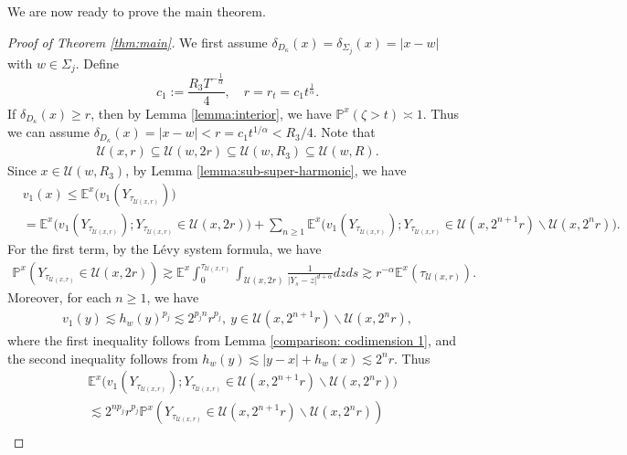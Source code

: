 \documentclass[12pt,a4paper]{amsart}
\numberwithin{equation}{section}
\theoremstyle{plain}
\newcommand{\Si}{\Sigma}
\newcommand{\mc}{\mathcal}
\newcommand{\mb}{\mathbb}
\newcommand{\1}{\mathbbm{1}}
\begin{document}
We are now ready  to prove the main theorem.

\begin{proof}[Proof of Theorem \ref{thm:main}] 
We first assume $\delta_{D_\kappa}(x) = \delta_{\Si_j}(x) = |x-w|$ with $w \in \Si_j$. Define
\begin{equation} \label{radius of t}
c_1 := \frac{R_3 T^{-\frac{1}{\alpha}}}{4},
\quad r = r_t = c_1 t^{\frac{1}{\alpha}}.
\end{equation}
If $\delta_{D_{\kappa}}(x) \ge r$, then by Lemma \ref{lemma:interior}, we have 
$\mb P^x(\zeta >t) \asymp 1$. 
Thus we can assume $\delta_{D_{\kappa}}(x) = |x-w| < r = c_1t^{1/\alpha} < 
R_3/4$. Note that 
\begin{align}\label{hierarchy of inclusion}
 \mc U(x,r)\subseteq \mc U(w,2r) \subseteq \mc U(w, R_3) \subseteq \mc U(w,R).
\end{align}
Since $x \in \mc U(w, R_3)$, by Lemma \ref{lemma:sub-super-harmonic}, we have
\begin{align*}
&  v_1(x) \le \mb E^x\big(v_1(Y_{\tau_{\mc U(x,r)}})\big) \\
& = \mb E^x\big(v_1(Y_{\tau_{\mc U(x,r)}}); Y_{\tau_{\mc U(x,r)}} \in \mc U(x,2r)\big) + \sum_{n\ge 1} \mb E^x\big(v_1(Y_{\tau_{\mc U(x,r)}}); Y_{\tau_{\mc U(x,r)}} \in \mc U(x,2^{n+1}r)\backslash \mc U(x,2^{n}r)\big).
\end{align*}
For the first term, by the L\'evy system formula, we have 
\begin{equation}\label{lower prob estimate}
\begin{aligned}
\mb P^x(Y_{\tau_{\mc U(x,r)}} \in \mc U(x,2r)) \gtrsim \mb E^x \int_0^{\tau_{\mc U(x,r)}} \int_{\mc U(x,2r)} \frac{1}{|Y_s - z|^{d+\alpha}}dzds \gtrsim r^{-\alpha} \mb E^x(\tau_{\mc U(x,r)}).
\end{aligned}
\end{equation}
Moreover, for each $n\ge 1$, we have 
\begin{align*}
v_1(y) \lesssim h_w(y)^{p_j} \lesssim 2^{p_j n}r^{p_j},\ y \in \mc U(x,2^{n+1}r)\backslash \mc U(x,2^{n}r),
\end{align*}
where the first inequality follows from Lemma \ref{comparison: codimension 1}, and the second inequality follows from 
$h_w(y) \lesssim |y-x| + h_w(x) \lesssim 2^n r$. 
Thus 
\begin{align*}
& \mb E^x\big(v_1(Y_{\tau_{\mc U(x,r)}}); Y_{\tau_{\mc U(x,r)}} \in \mc U(x,2^{n+1}r)\backslash \mc U(x,2^{n}r)\big) \\
& \lesssim 2^{np_j}r^{p_j} \mb P^x(Y_{\tau_{\mc U(x,r)}} \in \mc U(x,2^{n+1}r)\backslash \mc U(x,2^{n}r)) \\

\end{align*}
\end{proof}
\end{document}
